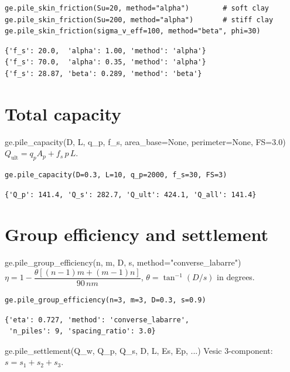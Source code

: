 \documentclass[11pt,a4paper,openany]{book}
\begin{document}
\begin{lstlisting}
ge.pile_skin_friction(Su=20, method="alpha")        # soft clay
ge.pile_skin_friction(Su=200, method="alpha")       # stiff clay
ge.pile_skin_friction(sigma_v_eff=100, method="beta", phi=30)
\end{lstlisting}
\begin{lstlisting}[style=output]
{'f_s': 20.0,  'alpha': 1.00, 'method': 'alpha'}
{'f_s': 70.0,  'alpha': 0.35, 'method': 'alpha'}
{'f_s': 28.87, 'beta': 0.289, 'method': 'beta'}
\end{lstlisting}

\section{Total capacity}

\begin{funcbox}{ge.pile\_capacity(D, L, q\_p, f\_s, area\_base=None, perimeter=None, FS=3.0)}
$Q_{\text{ult}} = q_p A_p + f_s\,p\,L$.
\end{funcbox}

\begin{lstlisting}
ge.pile_capacity(D=0.3, L=10, q_p=2000, f_s=30, FS=3)
\end{lstlisting}
\begin{lstlisting}[style=output]
{'Q_p': 141.4, 'Q_s': 282.7, 'Q_ult': 424.1, 'Q_all': 141.4}
\end{lstlisting}

\section{Group efficiency and settlement}

\begin{funcbox}{ge.pile\_group\_efficiency(n, m, D, s, method="converse\_labarre")}
$\eta = 1 - \dfrac{\theta[(n-1)m + (m-1)n]}{90\,n m}$,
$\theta = \tan^{-1}(D/s)$ in degrees.
\end{funcbox}

\begin{lstlisting}
ge.pile_group_efficiency(n=3, m=3, D=0.3, s=0.9)
\end{lstlisting}
\begin{lstlisting}[style=output]
{'eta': 0.727, 'method': 'converse_labarre',
 'n_piles': 9, 'spacing_ratio': 3.0}
\end{lstlisting}

\begin{funcbox}{ge.pile\_settlement(Q\_w, Q\_p, Q\_s, D, L, Es, Ep, ...)}
Vesic 3-component: $s = s_1 + s_2 + s_3$.
\end{funcbox}
\end{document}

